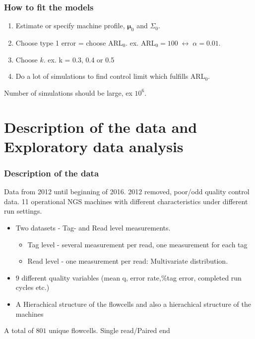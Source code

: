 \documentclass[10pt]{beamer}\usepackage[]{graphicx}\usepackage[]{color}
\begin{document}
\begin{frame}\frametitle{How to fit the models}
\begin{enumerate}
\item Estimate or specify machine profile, $\boldsymbol{\mu}_0$ and $\Sigma_0$.
\item Choose type 1 error = choose ARL$_0$. ex. ARL$_0 = 100\; \leftrightarrow \; \alpha=0.01$.
\item Choose $k$. ex. k = 0.3, 0.4 or 0.5
\item Do a lot of simulations to find control limit which fulfills ARL$_0$.
\end{enumerate}
Number of simulations should be large, ex $10^6$. 

\end{frame}

\section[ Desc. of data + EDA]{Description of the data and Exploratory data analysis}
\begin{frame}\frametitle{Description of the data}
Data from 2012 until beginning of 2016. 2012 removed, poor/odd quality control data. 11 operational NGS machines with different characteristics under different run settings. 
\begin{itemize}
\item Two datasets - Tag- and Read level measurements. 
\begin{itemize}
\item Tag level - several measurement per read, one measurement for each tag 
\item Read level - one measurement per read: Multivariate distribution.
\end{itemize}
\item $9$ different quality variables (mean q, error rate,\%tag error, completed run cycles etc.)
\item A Hierachical structure of the flowcells and also a hierachical structure of the machines
\end{itemize}
A total of $801$ unique flowcells. Single read/Paired end
\end{frame}
\end{document}
